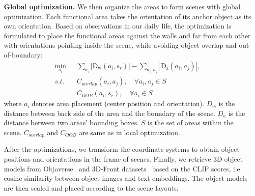 \noindent \textbf{Global optimization.} We then organize the areas to form scenes with global optimization. Each functional area takes the orientation of its anchor object as its own orientation. Based on observations in our daily life, the optimization is formulated to place the functional areas against the walls and far from each other with orientations pointing inside the scene, while avoiding object overlap and out-of-boundary:
\begin{equation}
\begin{aligned}
\min_{a_i} & \sum_{a_i} |\mathrm{D_w}(a_i, s_r)| - \sum_{a_i, a_j} |\mathrm{D_a}(a_i, a_j)|, \\
s.t. \quad & C_{overlap}(a_i, a_j), \quad \forall a_i,a_j \in S \\
& C_{OOB}(a_i, s_r), \quad \forall a_i \in S  
\end{aligned}
\end{equation}
where $a_i$ denotes area placement (center position and orientation). $D_w$ is the distance between back side of the area and the boundary of the scene. $D_a$ is the distance between two areas' bounding boxes. $S$ is the set of areas within the scene. $C_{overlap}$ and $C_{OOB}$ are same as in local optimization.

After the optimizations, we transform the coordinate systems to obtain object positions and orientations in the frame of scenes. Finally, we retrieve 3D object models from Objaverse~\cite{objaverseXL} and 3D-Front datasets~\cite{fu20213d} based on the CLIP scores, i.e. cosine similarity between object images and text embeddings. The object models are then scaled and placed according to the scene layouts.


